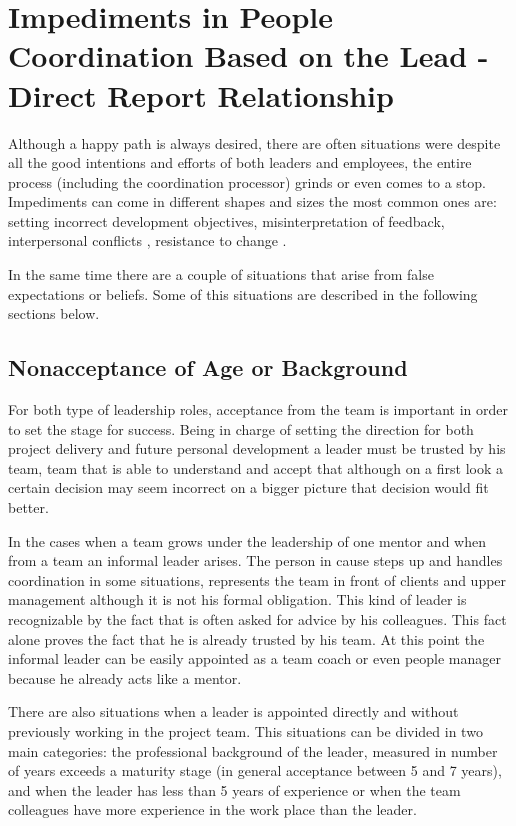 \chapter{Impediments in People Coordination Based on the Lead - Direct Report Relationship}
\label{chapter:impediments}

Although a happy path is always desired, there are often situations were despite all the good intentions and efforts of both leaders and employees, the entire process (including the coordination processor) grinds or even comes to a stop. Impediments can come in different shapes and sizes the most common ones are: setting incorrect development objectives, misinterpretation of feedback, interpersonal conflicts \cite{abur-pm}, resistance to change \cite{abur-tl}. 

In the same time there are a couple of situations that arise from false expectations or beliefs. Some of this situations are described in the following sections below.

\section{Nonacceptance of Age or Background}
\label{sec:unnaceptance}
For both type of leadership roles, acceptance from the team is important in order to set the stage for success. Being in charge of setting the direction for both project delivery and future personal development a leader must be trusted by his team, team that is able to understand and accept that although on a first look a certain decision may seem incorrect on a bigger picture that decision would fit better. 

In the cases when a team grows under the leadership of one mentor and when from a team an informal leader arises. The person in cause steps up and handles coordination in some situations, represents the team in front of clients and upper management although it is not his formal obligation. This kind of leader is recognizable by the fact that is often asked for advice by his colleagues. This fact alone proves the fact that he is already trusted by his team. At this point the informal leader can be easily appointed as a team coach or even people manager because he already acts like a mentor.

There are also situations when a leader is appointed directly and without previously working in the project team. This situations can be divided in two main categories: the professional background of the leader, measured in number of years exceeds a maturity stage (in general acceptance between 5 and 7 years), and when the leader has less than 5 years of experience or when the team colleagues have more experience in the work place than the leader.

